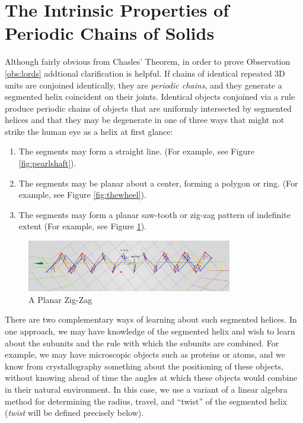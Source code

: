 \documentclass[11pt]{article}
\begin{document}
{\section{The Intrinsic Properties of Periodic Chains of Solids}

Although fairly obvious from Chasles' Theorem, in order to prove Observation \ref{obs:lords}
addtional clarification is helpful.
If chains of identical repeated 3D units are conjoined identically, they are {\em periodic chains},
and they generate a segmented helix coincident on their joints.
Identical objects conjoined via a rule
produce periodic chains of objects that are uniformly intersected
by segmented helices and that they may be degenerate in one of
three ways that might not strike the human eye as a helix at first glance:
\begin{enumerate}
\item The segments may form a straight line. (For example, see Figure \ref{fig:pearlshaft}).
\item The segments may be planar about a center, forming a polygon or ring. (For example, see Figure \ref{fig:thewheel}).
\item The segments may form a planar saw-tooth or zig-zag pattern of indefinite extent (For example, see Figure \ref{fig:planarzigzag}).
\end{enumerate}

\begin{figure}
     \centering
     \includegraphics[width=0.80\textwidth]{figures/PlanarZigZag.png}
     \caption{A Planar Zig-Zag}
  \label{fig:planarzigzag}
\end{figure}

There are two complementary ways of learning about such segmented helices.
In one approach, we may have knowledge of the segmented helix and
wish to learn about the subunits and the rule with which the subunits are combined.
For example, we may have microscopic objects such as proteins
or atoms, and we know from crystallography something about the positioning of these objects, without
knowing ahead of time the angles at which these objects would combine in their natural environment.
In this case, we use a variant of a linear algebra method\cite{kahn1989defining}
for determining the radius, travel, and ``twist''
of the segmented helix ({\em twist} will be defined precisely below).

}
\end{document}

